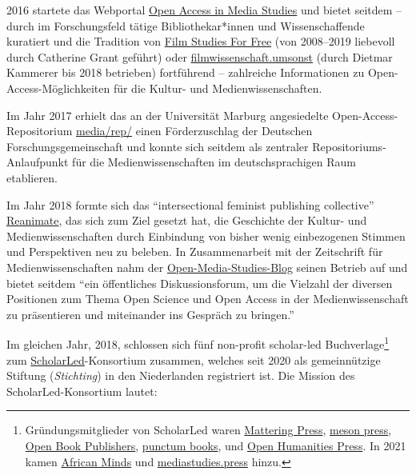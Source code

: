 \documentclass[a4paper,
fontsize=11pt,
oneside,
numbers=noperiodatend,
parskip=half-,
bibliography=totoc,
final
]{scrartcl}
\begin{document}
2016 startete das Webportal \href{https://oamediastudies.com/}{Open
Access in Media Studies} und bietet seitdem -- durch im Forschungsfeld
tätige Bibliothekar*innen und Wissenschaffende kuratiert und die
Tradition von \href{https://filmstudiesforfree.blogspot.com}{Film
Studies For Free} (von 2008--2019 liebevoll durch Catherine Grant
geführt) oder
\href{https://filmwissenschaftumsonst.wordpress.com}{filmwissenschaft.umsonst}
(durch Dietmar Kammerer bis 2018 betrieben) fortführend -- zahlreiche
Informationen zu Open-Access-Möglichkeiten für die Kultur- und
Medienwissenschaften.

Im Jahr 2017 erhielt das an der Universität Marburg angesiedelte
Open-Access-Repositorium \href{https://mediarep.org/}{media/rep/} einen
Förderzuschlag der Deutschen Forschungsgemeinschaft und konnte sich
seitdem als zentraler Repositoriums-Anlaufpunkt für die
Medienwissenschaften im deutschsprachigen Raum etablieren.

Im Jahr 2018 formte sich das \enquote{intersectional feminist publishing
collective} \href{https://www.roopikarisam.com/reanimatev2/}{Reanimate},
das sich zum Ziel gesetzt hat, die Geschichte der Kultur- und
Medienwissenschaften durch Einbindung von bisher wenig einbezogenen
Stimmen und Perspektiven neu zu beleben. In Zusammenarbeit mit der
Zeitschrift für Medienwissenschaften nahm der
\href{https://zfmedienwissenschaft.de/online/open-media-studies-blog/statement}{Open-Media-Studies-Blog}
seinen Betrieb auf und bietet seitdem \enquote{ein öffentliches
Diskussionsforum, um die Vielzahl der diversen Positionen zum Thema Open
Science und Open Access in der Medienwissenschaft zu präsentieren und
miteinander ins Gespräch zu bringen.}

Im gleichen Jahr, 2018, schlossen sich fünf non-profit scholar-led
Buchverlage\footnote{Gründungsmitglieder von ScholarLed waren
  \href{https://www.matteringpress.org}{Mattering Press},
  \href{https://meson.press}{meson press},
  \href{https://www.openbookpublishers.com}{Open Book Publishers},
  \href{https://punctumbooks.com}{punctum books}, und
  \href{http://www.openhumanitiespress.org/}{Open Humanities Press}. In
  2021 kamen \href{https://www.africanminds.co.za/}{African Minds} und
  \href{https://www.mediastudies.press/}{mediastudies.press} hinzu.} zum
\href{https://scholarled.org}{ScholarLed}-Konsortium zusammen, welches
seit 2020 als gemeinnützige Stiftung (\emph{Stichting}) in den
Niederlanden registriert ist. Die Mission des ScholarLed-Konsortium
lautet:
\end{document}
